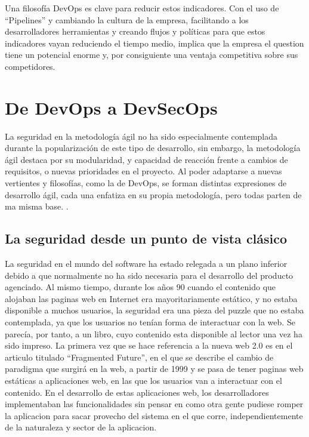 \documentclass[12pt]{report} %
\begin{document}
Una filosofía DevOps es clave para reducir estos indicadores.
Con el uso de ``Pipelines'' y cambiando la cultura de la empresa, facilitando a los desarrolladores herramientas y creando flujos y políticas para que estos indicadores vayan reduciendo el tiempo medio, implica que la empresa el question tiene un potencial enorme y, por consiguiente una ventaja competitiva sobre sus competidores.

\section{De DevOps a DevSecOps}

La seguridad en la metodología ágil no ha sido especialmente contemplada durante la popularización de este tipo de desarrollo, sin embargo, la metodología ágil destaca por su modularidad, y capacidad de reacción frente a cambios de requisitos, o nuevas prioridades en el proyecto.
Al poder adaptarse a nuevas vertientes y filosofías, como la de DevOps, se forman distintas expresiones de desarrollo ágil, cada una enfatiza en su propia metodología, pero todas parten de ma misma base. \cite{agilePrinciples}.

\subsection{La seguridad desde un punto de vista clásico}
 
La seguridad en el mundo del software ha estado relegada a un plano inferior debido a que normalmente no ha sido necesaria para el desarrollo del producto agenciado.
Al mismo tiempo, durante los años 90 cuando el contenido que alojaban las paginas web en Internet era mayoritariamente estático, y no estaba disponible a muchos usuarios, la seguridad era una pieza del puzzle que no estaba contemplada, ya que los usuarios no tenían forma de interactuar con la web.
Se parecía, por tanto, a un libro, cuyo contenido esta disponible al lector una vez ha sido impreso.
La primera vez que se hace referencia a la nueva web 2.0 es en el articulo titulado ``Fragmented Future'', en el que se describe el cambio de paradigma que surgirá en la web, a partir de 1999 y se pasa de tener paginas web estáticas a aplicaciones web, en las que los usuarios van a interactuar con el contenido. \cite{DiNucci1999}
En el desarrollo de estas aplicaciones web, los desarrolladores implementaban las funcionalidades sin pensar en como otra gente pudiese romper la aplicacion para sacar provecho del sistema en el que corre, independientemente de la naturaleza y sector de la aplicacion.
\end{document}
